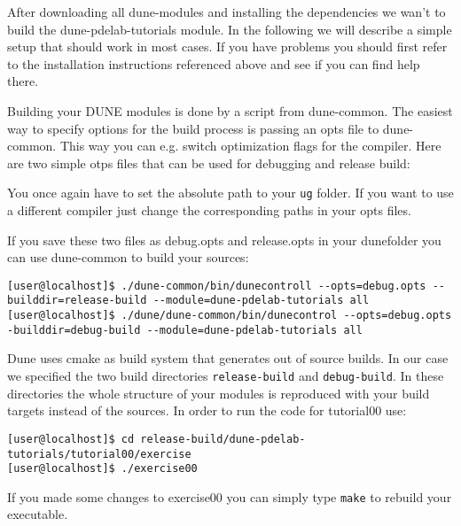\documentclass[12pt,a4paper]{article}
\begin{document}
After downloading all dune-modules and installing the dependencies we
wan't to build the dune-pdelab-tutorials module.  In the following we
will describe a simple setup that should work in most cases.  If you
have problems you should first refer to the installation instructions
referenced above and see if you can find help there.

Building your DUNE modules is done by a script from dune-common.  The
easiest way to specify  options for the build process is passing an
opts file to dune-common.  This way you can e.g. switch optimization
flags for the compiler.  Here are two simple otps files that can be
used for debugging and release build:



You once again have to set the absolute path to your \lstinline{ug}
folder.  If you want to use a different compiler just change the
corresponding paths in your opts files.

If you save these two files as debug.opts and release.opts in your
dunefolder you can use dune-common to build your sources:
\begin{lstlisting}
[user@localhost]$ ./dune-common/bin/dunecontroll --opts=debug.opts --builddir=release-build --module=dune-pdelab-tutorials all
[user@localhost]$ ./dune/dune-common/bin/dunecontrol --opts=debug.opts -builddir=debug-build --module=dune-pdelab-tutorials all
\end{lstlisting}
Dune uses cmake as build system that generates out of source builds.
In our case we specified the two build directories
\lstinline{release-build} and \lstinline{debug-build}.  In these
directories the whole structure of your modules is reproduced with
your build targets instead of the sources.  In order to run the
code for tutorial00 use:
\begin{lstlisting}
[user@localhost]$ cd release-build/dune-pdelab-tutorials/tutorial00/exercise
[user@localhost]$ ./exercise00
\end{lstlisting}
 If you made some changes to exercise00
 you can simply type \lstinline{make} to rebuild
your executable.
\end{document}
